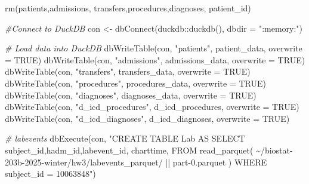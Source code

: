 \documentclass[
]{article}
\newenvironment{Shaded}{\begin{snugshade}}{\end{snugshade}}
\newcommand{\AttributeTok}[1]{\textcolor[rgb]{0.77,0.63,0.00}{#1}}
\newcommand{\CommentTok}[1]{\textcolor[rgb]{0.56,0.35,0.01}{\textit{#1}}}
\newcommand{\ConstantTok}[1]{\textcolor[rgb]{0.00,0.00,0.00}{#1}}
\newcommand{\FunctionTok}[1]{\textcolor[rgb]{0.00,0.00,0.00}{#1}}
\newcommand{\NormalTok}[1]{\textcolor[rgb]{0.00,0.00,0.00}{#1}}
\newcommand{\OtherTok}[1]{\textcolor[rgb]{0.56,0.35,0.01}{#1}}
\newcommand{\SpecialCharTok}[1]{\textcolor[rgb]{0.00,0.00,0.00}{#1}}
\newcommand{\StringTok}[1]{\textcolor[rgb]{0.31,0.60,0.02}{#1}}
\begin{document}
\begin{Shaded}
\begin{Highlighting}[]
\FunctionTok{rm}\NormalTok{(patients,admissions,}
\NormalTok{   transfers,procedures,diagnoses,}
\NormalTok{   patient\_id)}
\end{Highlighting}
\end{Shaded}

\begin{Shaded}
\begin{Highlighting}[]
\CommentTok{\#Connect to DuckDB}
\NormalTok{con }\OtherTok{\textless{}{-}} \FunctionTok{dbConnect}\NormalTok{(duckdb}\SpecialCharTok{::}\FunctionTok{duckdb}\NormalTok{(), }\AttributeTok{dbdir =} \StringTok{":memory:"}\NormalTok{)}

\CommentTok{\#  Load \textasciigrave{}data\textasciigrave{} into DuckDB}
\FunctionTok{dbWriteTable}\NormalTok{(con, }\StringTok{"patients"}\NormalTok{, patient\_data, }\AttributeTok{overwrite =} \ConstantTok{TRUE}\NormalTok{)}
\FunctionTok{dbWriteTable}\NormalTok{(con, }\StringTok{"admissions"}\NormalTok{, admissions\_data, }\AttributeTok{overwrite =} \ConstantTok{TRUE}\NormalTok{)}
\FunctionTok{dbWriteTable}\NormalTok{(con, }\StringTok{"transfers"}\NormalTok{, transfers\_data, }\AttributeTok{overwrite =} \ConstantTok{TRUE}\NormalTok{)}
\FunctionTok{dbWriteTable}\NormalTok{(con, }\StringTok{"procedures"}\NormalTok{, procedures\_data, }\AttributeTok{overwrite =} \ConstantTok{TRUE}\NormalTok{)}
\FunctionTok{dbWriteTable}\NormalTok{(con, }\StringTok{"diagnoses"}\NormalTok{, diagnoses\_data, }\AttributeTok{overwrite =} \ConstantTok{TRUE}\NormalTok{)}
\FunctionTok{dbWriteTable}\NormalTok{(con, }\StringTok{"d\_icd\_procedures"}\NormalTok{, d\_icd\_procedures, }\AttributeTok{overwrite =} \ConstantTok{TRUE}\NormalTok{)}
\FunctionTok{dbWriteTable}\NormalTok{(con, }\StringTok{"d\_icd\_diagnoses"}\NormalTok{, d\_icd\_diagnoses, }\AttributeTok{overwrite =} \ConstantTok{TRUE}\NormalTok{)}
\end{Highlighting}
\end{Shaded}

\begin{Shaded}
\begin{Highlighting}[]
\CommentTok{\#  labevents}
\FunctionTok{dbExecute}\NormalTok{(con, }\StringTok{"CREATE TABLE Lab AS }
\StringTok{                SELECT subject\_id,hadm\_id,labevent\_id,}
\StringTok{                charttime,}
\StringTok{                FROM read\_parquet(}
\StringTok{    \textquotesingle{}\textasciitilde{}/biostat{-}203b{-}2025{-}winter/hw3/labevents\_parquet/\textquotesingle{} || }
\StringTok{    \textquotesingle{}part{-}0.parquet\textquotesingle{}}
\StringTok{  )}
\StringTok{                WHERE subject\_id = 10063848"}\NormalTok{)}
\end{Highlighting}
\end{Shaded}
\end{document}

